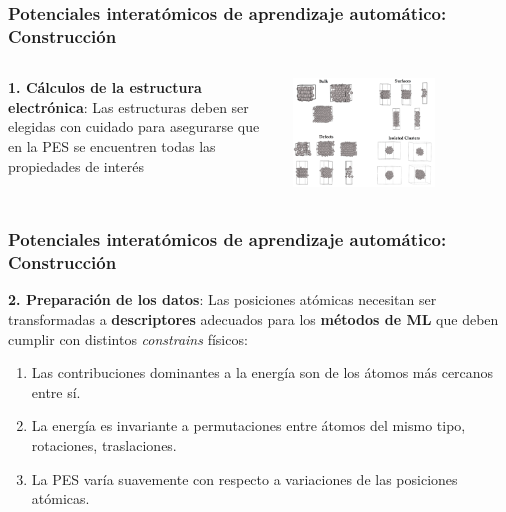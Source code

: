 \documentclass[aspectratio=169]{beamer}
\let\oldtextbf\textbf
\renewcommand{\textbf}[1]{\textcolor{nordblue}{\oldtextbf{#1}}}
\begin{document}
    \begin{frame}
        \frametitle{Potenciales interatómicos de aprendizaje automático: Construcción}
        
        \begin{columns}
            \textbf{1. Cálculos de la estructura electrónica}: Las estructuras deben
            ser elegidas con cuidado para asegurarse que en la PES se encuentren 
            todas las propiedades de interés

            \begin{center}
                \includegraphics[width=0.65\textwidth]{intro-dft_data.png}
            \end{center}
        \end{columns}

    \end{frame}
    
    \begin{frame}
        \frametitle{Potenciales interatómicos de aprendizaje automático: Construcción}

        \textbf{2. Preparación de los datos}: Las posiciones atómicas necesitan 
        ser transformadas a \textbf{descriptores} adecuados para los 
        \textbf{métodos de ML} que deben cumplir con distintos \textit{constrains} 
        físicos:
        \begin{enumerate}
            \item Las contribuciones dominantes a la energía son de los átomos 
                más cercanos entre sí.
            \item La energía es invariante a permutaciones entre átomos del mismo 
                tipo, rotaciones, traslaciones.
            \item La PES varía suavemente con respecto a variaciones de las
                posiciones atómicas.
        \end{enumerate}

	\end{frame}
    
\end{document}
